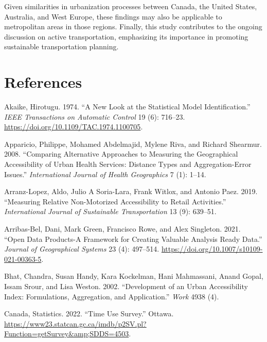 \documentclass[preprint, 3p,
authoryear]{elsarticle} %
\newlength{\cslhangindent}
\newenvironment{CSLReferences}[2] %
 {\begin{list}{}{%
  \setlength{\itemindent}{0pt}
  \setlength{\leftmargin}{0pt}
  \setlength{\parsep}{0pt}
  \ifodd #1
   \setlength{\leftmargin}{\cslhangindent}
   \setlength{\itemindent}{-1\cslhangindent}
  \fi
  \setlength{\itemsep}{#2\baselineskip}}}
 {\end{list}}
\begin{document}
Given similarities in urbanization processes between Canada, the United
States, Australia, and West Europe, these findings may also be
applicable to metropolitan areas in those regions. Finally, this study
contributes to the ongoing discussion on active transportation,
emphasizing its importance in promoting sustainable transportation
planning.

\section*{References}\label{references}

\label{refs}
\begin{CSLReferences}{1}{0}
Akaike, Hirotugu. 1974. {``A New Look at the Statistical Model
Identification.''} \emph{IEEE Transactions on Automatic Control} 19 (6):
716--23. \url{https://doi.org/10.1109/TAC.1974.1100705}.

Apparicio, Philippe, Mohamed Abdelmajid, Mylene Riva, and Richard
Shearmur. 2008. {``Comparing Alternative Approaches to Measuring the
Geographical Accessibility of Urban Health Services: Distance Types and
Aggregation-Error Issues.''} \emph{International Journal of Health
Geographics} 7 (1): 1--14.

Arranz-Lopez, Aldo, Julio A Soria-Lara, Frank Witlox, and Antonio Paez.
2019. {``Measuring Relative Non-Motorized Accessibility to Retail
Activities.''} \emph{International Journal of Sustainable
Transportation} 13 (9): 639--51.

Arribas-Bel, Dani, Mark Green, Francisco Rowe, and Alex Singleton. 2021.
{``Open Data Products-A Framework for Creating Valuable Analysis Ready
Data.''} \emph{Journal of Geographical Systems} 23 (4): 497--514.
\url{https://doi.org/10.1007/s10109-021-00363-5}.

Bhat, Chandra, Susan Handy, Kara Kockelman, Hani Mahmassani, Anand
Gopal, Issam Srour, and Lisa Weston. 2002. {``Development of an Urban
Accessibility Index: Formulations, Aggregation, and Application.''}
\emph{Work} 4938 (4).

Canada, Statistics. 2022. {``Time Use Survey.''} Ottawa.
\url{https://www23.statcan.gc.ca/imdb/p2SV.pl?Function=getSurvey&amp;SDDS=4503}.


\end{CSLReferences}
\end{document}
